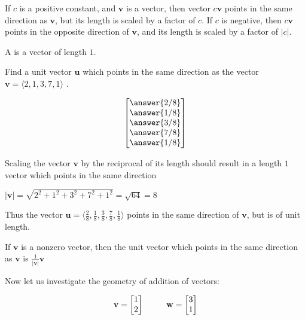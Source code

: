 \documentclass{ximera}
\begin{document}
\begin{observation}
	If $c$ is a positive constant, and $\mathbf{v}$ is a vector, then vector $c\mathbf{v}$ points in the same direction as $\mathbf{v}$, but its length is scaled by a factor of $c$.  If $c$ is negative, then $c\mathbf{v}$ points in the opposite direction of $\mathbf{v}$, and its length is scaled by a factor of $|c|$.
\end{observation}

\begin{definition}
	A  is a vector of length $1$.
\end{definition}

\begin{question}
	Find a unit vector $\mathbf{u}$ which points in the same direction as the vector $\mathbf{v} = \langle 2,1,3,7,1\rangle$ .
	
	\[
	\begin{bmatrix}
	\answer{2/8}\\
	\answer{1/8}\\
	\answer{3/8}\\
	\answer{7/8}\\
	\answer{1/8}
	\end{bmatrix}
	\]
	
	\begin{hint}
		Scaling the vector $\mathbf{v}$ by the reciprocal of its length should result in a length $1$ vector which points in the same direction
	\end{hint}
	
	\begin{hint}
		$|\mathbf{v}| = \sqrt{2^2+1^2+3^2+7^2+1^2} = \sqrt{64} = 8$
	\end{hint}
	
	\begin{hint}
		Thus the vector $ \mathbf{u} = \langle \frac{2}{8},  \frac{1}{8},\frac{3}{8},\frac{7}{8},\frac{1}{8}\rangle$ points in the same direction of $\mathbf{v}$, but is of unit length.
	\end{hint}
\end{question}

\begin{observation}
	If $\mathbf{v}$ is a nonzero vector, then the unit vector which points in the same direction as $\mathbf{v}$ is $\frac{1}{|\mathbf{v}|} \mathbf{v}$
\end{observation}

Now let us investigate the geometry of addition of vectors:

\[
\mathbf{v} = \begin{bmatrix} 1  \\ 2  \end{bmatrix} \hphantom{fdsfd} \mathbf{w} = \begin{bmatrix} 3  \\ 1  \end{bmatrix}
\]
\end{document}
